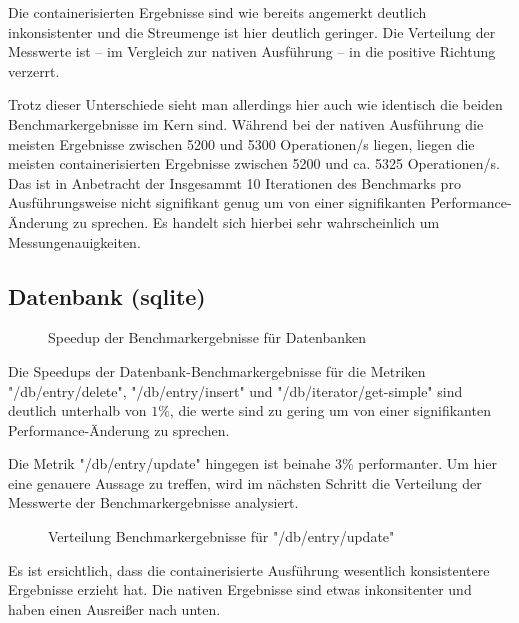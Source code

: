 Die containerisierten Ergebnisse sind wie bereits angemerkt deutlich inkonsistenter und die Streumenge ist hier deutlich geringer. Die Verteilung der Messwerte ist – im Vergleich zur nativen Ausführung – in die positive Richtung verzerrt.  

Trotz dieser Unterschiede sieht man allerdings hier auch wie identisch die beiden Benchmarkergebnisse im Kern sind. Während bei der nativen Ausführung die meisten Ergebnisse zwischen 5200 und 5300 Operationen/s liegen, liegen die meisten containerisierten Ergebnisse zwischen 5200 und ca. 5325 Operationen/s. Das ist in Anbetracht der Insgesammt 10 Iterationen des Benchmarks pro Ausführungsweise nicht signifikant genug um von einer signifikanten Performance-Änderung zu sprechen. Es handelt sich hierbei sehr wahrscheinlich um Messungenauigkeiten. 


\subsection{Datenbank (sqlite)}

\begin{figure}
    \centering
    
    \caption{Speedup der Benchmarkergebnisse für Datenbanken}
    \label{fig:speedup_db}
\end{figure}

\FloatBarrier

Die Speedups der Datenbank-Benchmarkergebnisse für die Metriken "/db/entry/delete", "/db/entry/insert" und "/db/iterator/get-simple" sind deutlich unterhalb von $1\%$, die werte sind zu gering um von einer signifikanten Performance-Änderung zu sprechen. 

Die Metrik "/db/entry/update" hingegen ist beinahe $3\%$ performanter. Um hier eine genauere Aussage zu treffen, wird im nächsten Schritt die Verteilung der Messwerte der Benchmarkergebnisse analysiert.

\begin{figure}
    \centering
    
    \caption{Verteilung Benchmarkergebnisse für "/db/entry/update"}
    \label{fig:mdist_db_entry_update}
\end{figure}

\FloatBarrier

Es ist ersichtlich, dass die containerisierte Ausführung wesentlich konsistentere Ergebnisse erzieht hat. 
Die nativen Ergebnisse sind etwas inkonsitenter und haben einen Ausreißer nach unten. 

